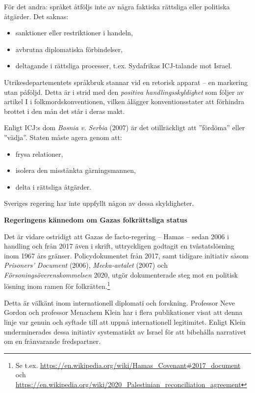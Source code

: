 \medskip

För det andra: språket åtföljs inte av några faktiska rättsliga eller politiska åtgärder. Det saknas:

\begin{itemize}
  \item sanktioner eller restriktioner i handeln,
  \item avbrutna diplomatiska förbindelser,
  \item deltagande i rättsliga processer, t.ex. Sydafrikas ICJ-talande mot Israel.
\end{itemize}

Utrikesdepartementets språkbruk stannar vid en retorisk apparat – en markering utan påföljd. Detta är i strid med den \textit{positiva handlingsskyldighet} som följer av artikel I i folkmordskonventionen, vilken ålägger konventionsstater att förhindra brottet i den mån det står i deras makt.

\medskip

Enligt ICJ:s dom \textit{Bosnia v. Serbia} (2007) är det otillräckligt att ”fördöma” eller ”vädja”. Staten måste agera genom att:

\begin{itemize}
    \item frysa relationer,
    \item isolera den misstänkta gärningsmannen,
    \item delta i rättsliga åtgärder.
\end{itemize}

Sveriges regering har inte uppfyllt någon av dessa skyldigheter.

\medskip

\textbf{Regeringens kännedom om Gazas folkrättsliga status}

Det är vidare ostridigt att Gazas de facto-regering – Hamas – sedan 2006 i handling och från 2017 även i skrift, 
uttryckligen godtagit en tvåstatslösning inom 1967 års gränser. Policydokumentet från 2017, samt tidigare initiativ 
såsom \textit{Prisoners’ Document} (2006), \textit{Mecka-avtalet} (2007) och \textit{Försoningsöverenskommelsen} 2020, 
utgör dokumenterade steg mot en politisk lösning inom ramen för folkrätten.\footnote{Se t.ex. \url{https://en.wikipedia.org/wiki/Hamas_Covenant\#2017_document} och \url{https://en.wikipedia.org/wiki/2020_Palestinian_reconciliation_agreement}}

Detta är välkänt inom internationell diplomati och forskning. Professor Neve Gordon och professor Menachem Klein 
har i flera publikationer visat att denna linje var genuin och syftade till att uppnå internationell legitimitet. 
Enligt Klein underminerades dessa initiativ systematiskt av Israel för att bibehålla narrativet om en frånvarande fredspartner.

